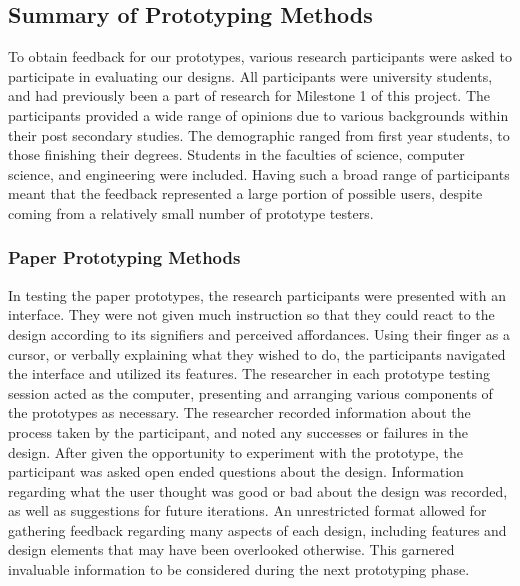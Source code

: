 \documentclass{article}
\begin{document}
\subsection{Summary of Prototyping Methods}


To obtain feedback for our prototypes, various research participants were asked to participate in evaluating our designs. All participants were university students, and had previously been a part of research for Milestone 1 of this project. The participants provided a wide range of opinions due to various backgrounds within their post secondary studies. The demographic ranged from first year students, to those finishing their degrees. Students in the faculties of science, computer science, and engineering were included. Having such a broad range of participants meant that the feedback represented a large portion of possible users, despite coming from a relatively small number of prototype testers.
\newline 




\subsubsection{Paper Prototyping Methods}
\newline
In testing the paper prototypes, the research participants were presented with an interface. They were not given much instruction so that they could react to the design according to its signifiers and perceived affordances. Using their finger as a cursor, or verbally explaining what they wished to do, the participants navigated the interface and utilized its features. The researcher in each prototype testing session acted as the computer, presenting and arranging various components of the prototypes as necessary. The researcher recorded information about the process taken by the participant, and noted any successes or failures in the design. After given the opportunity to experiment with the prototype, the participant was asked open ended questions about the design. Information regarding what the user thought was good or bad about the design was recorded, as well as suggestions for future iterations. An unrestricted format allowed for gathering feedback regarding many aspects of each design, including features and design elements that may have been overlooked otherwise. This garnered invaluable information to be considered during the next prototyping phase.
\end{document}
